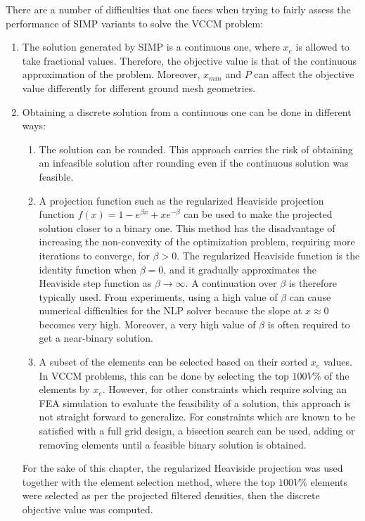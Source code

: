   There are a number of difficulties that one faces when trying to fairly assess the performance of SIMP variants to solve the VCCM problem:
  \begin{enumerate}
    \item The solution generated by SIMP is a continuous one, where $x_e$ is allowed to take fractional values. Therefore, the objective value is that of the continuous approximation of the problem. Moreover, $x_{min}$ and $P$ can affect the objective value differently for different ground mesh geometries.
    \item Obtaining a discrete solution from a continuous one can be done in different ways:
      \begin{enumerate}
        \item The solution can be rounded. This approach carries the risk of obtaining an infeasible solution after rounding even if the continuous solution was feasible.
        \item A projection function such as the regularized Heaviside projection function $f(x) = 1 - e^{\beta x} + x e^{-\beta}$ \citep{Guest2004} can be used to make the projected solution closer to a binary one. This method has the disadvantage of increasing the non-convexity of the optimization problem, requiring more iterations to converge, for $\beta > 0$. The regularized Heaviside function is the identity function when $\beta = 0$, and it gradually approximates the Heaviside step function as $\beta \to \infty$. A continuation over $\beta$ is therefore typically used. From experiments, using a high value of $\beta$ can cause numerical difficulties for the NLP solver because the slope at $x \approx 0$ becomes very high. Moreover, a very high value of $\beta$ is often required to get a near-binary solution.
        \item A subset of the elements can be selected based on their sorted $x_e$ values. In VCCM problems, this can be done by selecting the top $100V\%$ of the elements by $x_e$. However, for other constraints which require solving an FEA simulation to evaluate the feasibility of a solution, this approach is not straight forward to generalize. For constraints which are known to be satisfied with a full grid design, a bisection search can be used, adding or removing elements until a feasible binary solution is obtained.
      \end{enumerate}
      For the sake of this chapter, the regularized Heaviside projection was used together with the element selection method, where the top $100V\%$ elements were selected as per the projected filtered densities, then the discrete objective value was computed.

\end{enumerate}
